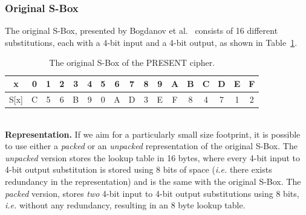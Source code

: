 \documentclass[11pt]{article}
\begin{document}
\subsubsection{Original S-Box}\label{osbox}
The original S-Box, presented by Bogdanov et al.~\cite{bogdanov2007present} consists of 16 different substitutions, each with a 4-bit input and a 4-bit output, as shown in Table~\ref{original_sbox}.
\begin{table}[h]
\footnotesize
\centering
\begin{tabular}{| c | c  | c | c | c  | c | c | c  | c | c | c  | c | c | c  | c | c | c |}
\hline
  x & 0 & 1 & 2 & 3 & 4 & 5 & 6 & 7 & 8 & 9 & A & B & C & D & E & F   \\
\hline
  S[x] & C & 5 & 6 & B & 9 & 0 & A & D & 3 & E & F & 8 & 4 & 7 & 1 & 2   \\
\hline
\end{tabular}
 \caption{\footnotesize The original S-Box of the PRESENT cipher.}
 \label{original_sbox}
\end{table}\\
\textbf{Representation.} If we aim for a particularly small size footprint, it is possible to use either a \emph{packed} or an \emph{unpacked} representation of the original S-Box. The \emph{unpacked} version stores the lookup table in 16 bytes, where every 4-bit input to 4-bit output substitution is stored using 8 bits of space (\emph{i.e.} there exists redundancy in the representation) and is the same with the original S-Box. The \emph{packed} version, stores \emph{two} 4-bit input to 4-bit output substitutions using 8 bits, \emph{i.e.} without any redundancy, resulting in an 8 byte lookup table. \\
\end{document}

